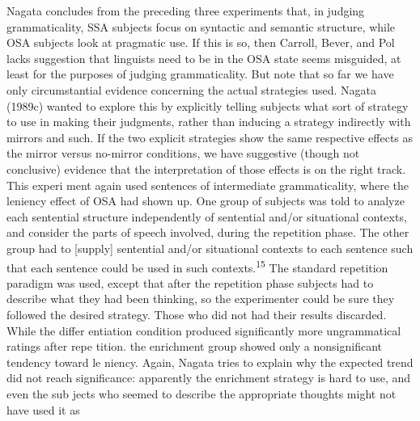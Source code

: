 \begin{styleTextbody}
Nagata concludes from the preceding three experiments that, in judging grammaticality, SSA subjects focus on syntactic and semantic structure, while OSA subjects look at pragmatic use. If this is so, then Carroll, Bever, and Pol\- lack{\textquotesingle}s suggestion that linguists need to be in the OSA state seems misguided, at least for the purposes of judging grammaticality. But note that so far we have only circumstantial evidence concerning the actual strategies used. Nagata (1989c) wanted to explore this by explicitly telling subjects what sort of strategy to use in making their judgments, rather than inducing a strategy indirectly with mirrors and such. If the two explicit strategies show the same respective effects as the mirror versus no-mirror conditions, we have suggestive (though not conclusive) evidence that the interpretation of those effects is on the right track. This experi\- ment again used sentences of intermediate grammaticality, where the leniency effect of OSA had shown up. One group of subjects was told to {\textquotedbl}analyze each sentential structure independently of sentential and/or situational contexts,{\textquotedbl} and consider the parts of speech involved, during the repetition phase. The other group had to {\textquotedbl}[supply] sentential and/or situational contexts to each sentence such that each sentence could be used in such contexts.{\textquotedbl}\textsuperscript{15}\textsuperscript{ }The standard repetition paradigm was used, except that after the repetition phase subjects had to describe what they had been thinking, so the experimenter could be sure they followed the desired strategy. Those who did not had their results discarded. While the differ\- entiation condition produced significantly more ungrammatical ratings after repe\- tition. the enrichment group showed only a nonsignificant tendency toward le\- niency. Again, Nagata tries to explain why the expected trend did not reach significance: apparently the enrichment strategy is hard to use, and even the sub\- jects who seemed to describe the appropriate thoughts might not have used it as
\end{styleTextbody}


